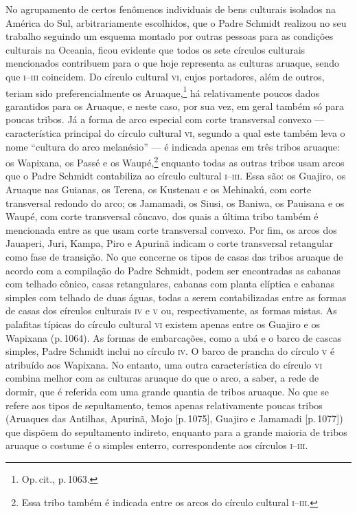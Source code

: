 No agrupamento de certos fenômenos individuais de bens culturais
isolados na América do Sul, arbitrariamente escolhidos, que o Padre
Schmidt realizou no seu trabalho seguindo um esquema montado por outras
pessoas para as condições culturais na Oceania, ficou evidente que
todos os sete círculos culturais mencionados contribuem para o que hoje
representa as culturas aruaque, sendo que \textsc{i--iii} coincidem. Do círculo
cultural \textsc{vi}, cujos portadores, além de outros, teriam sido
preferencialmente os Aruaque,\footnote{Op.\,cit., p.\,1063.} há
relativamente poucos dados garantidos para os Aruaque, e neste caso,
por sua vez, em geral também só para poucas tribos. Já a forma de arco
especial com corte transversal convexo --- característica principal do
círculo cultural \textsc{vi}, segundo a qual este também leva o nome ``cultura do
arco melanésio'' --- é indicada apenas em três tribos aruaque: os
Wapixana, os Passé e os Waupé,\footnote{Essa tribo também é indicada
  entre os arcos do círculo cultural \textsc{i--iii}.} enquanto todas as outras
tribos usam arcos que o Padre Schmidt contabiliza ao círculo cultural
\textsc{i--iii}. Essa são: os Guajiro, os Aruaque nas Guianas, os Terena, os
Kustenau e os Mehinakú, com corte transversal redondo do arco; os
Jamamadi, os Siusi, os Baniwa, os Pauisana e os Waupé, com corte
transversal côncavo, dos quais a última tribo também é mencionada entre
as que usam corte transversal convexo. Por fim, os arcos dos Jauaperi,
Juri, Kampa, Piro e Apurinã indicam o corte transversal retangular como
fase de transição. No que concerne os tipos de casas das tribos aruaque
de acordo com a compilação do Padre Schmidt, podem ser encontradas as
cabanas com telhado cônico, casas retangulares, cabanas com planta
elíptica e cabanas simples com telhado de duas águas, todas a serem
contabilizadas entre as formas de casas dos círculos culturais \textsc{iv} e \textsc{v}
ou, respectivamente, as formas mistas. As palafitas típicas do círculo
cultural \textsc{vi} existem apenas entre os Guajiro e os Wapixana (p.\,1064). As
formas de embarcações, como a ubá e o barco de cascas simples, Padre
Schmidt inclui no círculo \textsc{iv}. O barco de prancha do círculo \textsc{v} é
atribuído aos Wapixana. No entanto, uma outra característica do círculo
\textsc{vi} combina melhor com as culturas aruaque do que o arco, a saber, a rede
de dormir, que é referida com uma grande quantia de tribos aruaque. No
que se refere aos tipos de sepultamento, temos apenas relativamente
poucas tribos (Aruaques das Antilhas, Apurinã, Mojo {[}p.\,1075{]},
Guajiro e Jamamadi {[}p.\,1077{]}) que dispõem do sepultamento indireto,
enquanto para a grande maioria de tribos aruaque o costume é o simples
enterro, correspondente aos círculos \textsc{i--iii}.

